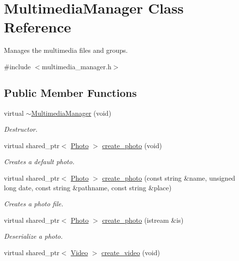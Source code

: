 \hypertarget{class_multimedia_manager}{\section{Multimedia\-Manager Class Reference}
\label{class_multimedia_manager}
}


Manages the multimedia files and groups.  




{\ttfamily \#include $<$multimedia\-\_\-manager.\-h$>$}

\subsection*{Public Member Functions}
\begin{DoxyCompactItemize}
\item 
virtual \hyperlink{class_multimedia_manager_acffc32fc3ac866e8aa01408c4dd8fce3}{$\sim$\-Multimedia\-Manager} (void)
\begin{DoxyCompactList}\small\item\em Destructor. \end{DoxyCompactList}\item 
virtual shared\-\_\-ptr$<$ \hyperlink{class_photo}{Photo} $>$ \hyperlink{class_multimedia_manager_a835209002b726811b325ef326b3fa6fd}{create\-\_\-photo} (void)
\begin{DoxyCompactList}\small\item\em Creates a default photo. \end{DoxyCompactList}\item 
virtual shared\-\_\-ptr$<$ \hyperlink{class_photo}{Photo} $>$ \hyperlink{class_multimedia_manager_a26f3f416ddd521a4be3998cd8a766c09}{create\-\_\-photo} (const string \&name, unsigned long date, const string \&pathname, const string \&place)
\begin{DoxyCompactList}\small\item\em Creates a photo file. \end{DoxyCompactList}\item 
virtual shared\-\_\-ptr$<$ \hyperlink{class_photo}{Photo} $>$ \hyperlink{class_multimedia_manager_a6db30d90657a2e9d3aa00a316338ccff}{create\-\_\-photo} (istream \&is)
\begin{DoxyCompactList}\small\item\em Deserialize a photo. \end{DoxyCompactList}\item 
virtual shared\-\_\-ptr$<$ \hyperlink{class_video}{Video} $>$ \hyperlink{class_multimedia_manager_ae18114802de3529b7d0d20772a7288da}{create\-\_\-video} (void)

\end{DoxyCompactItemize}
